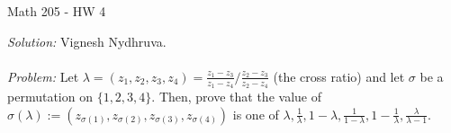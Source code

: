 

\begin{center}
	Math 205 - HW 4
\end{center} 

\noindent \textit{Solution: } Vignesh Nydhruva.  
\\ 
\\
\textit{Problem: } Let $\lambda = (z_1,z_2,z_3,z_4) = \frac{z_1 - z_3}{z_1 - z_4} / \frac{z_2 - z_3}{z_2 - z_4}$ (the cross ratio) and let $\sigma$ be a permutation on $\{1,2,3,4\}$. Then, prove that the value of $\sigma(\lambda) := (z_{\sigma(1)}, z_{\sigma(2)}, z_{\sigma(3)}, z_{\sigma(4)})$ is one of $\lambda, \frac{1}{\lambda}, 1 - \lambda, \frac{1}{1-\lambda}, 1 - \frac{1}{\lambda}, \frac{\lambda}{\lambda - 1}$. 
\\
\\
